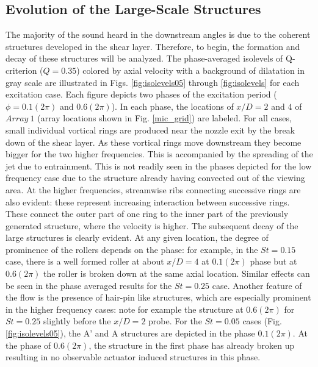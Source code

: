 \documentclass[english]{aiaa-tc}
\begin{document}
\subsection{Evolution of the Large-Scale Structures}\label{structure}
The majority of the sound heard in the downstream angles is due to the coherent structures developed in the shear layer. Therefore, to begin, the formation and decay of these structures will be analyzed. The phase-averaged isolevels of Q-criterion ($Q=0.35$) colored by axial velocity with a background of dilatation in gray scale are illustrated in Figs. \ref{fig:isolevels05} through \ref{fig:isolevels} for each excitation case. Each figure depicts two phases of the excitation period ($\phi =0.1(2\pi)$ and $0.6(2\pi)$). In each phase, the locations of $x/D=2$ and $4$ of $Array~1$ (array locations shown in Fig. \ref{mic_grid}) are labeled.
For all cases, small individual vortical rings are produced near the
nozzle exit by the break down of the shear layer. As these vortical
rings move downstream they become bigger for the two higher
frequencies.  This is accompanied by the spreading of the jet due to
entrainment.  This is not readily seen in the phases depicted for the low frequency case due to the structure already having convected out of the viewing area. At the higher frequencies, streamwise ribs connecting
successive rings are also evident\cite{gdv2011-POF}: these represent
increasing interaction between successive rings.  These connect the
outer part of one ring to the inner part of the previously generated
structure, where the velocity is higher.  The subsequent decay of
the large structures is clearly evident.  At any given location, the
degree of prominence of the rollers depends on the phase: for example,
in the $St=0.15$ case, there is a well formed roller at about $x/D=4$ at
$0.1(2\pi)$ phase but at $0.6(2\pi)$ the roller is broken
down at the same axial location.  Similar effects can be seen in the
phase averaged results for the $St=0.25$ case. Another feature of the
flow is the presence of hair-pin like structures, which are especially
prominent in the higher frequency cases: note for example the
structure at $0.6(2\pi)$ for $St=0.25$ slightly before the $x/D=2$
probe.
For the $St=0.05$ cases (Fig. \ref{fig:isolevels05}), the A' and A structures are depicted in the phase $0.1(2\pi)$. At the phase of $0.6(2\pi)$, the structure in the first phase has already broken up resulting in no observable actuator induced structures in this phase.
\end{document}
